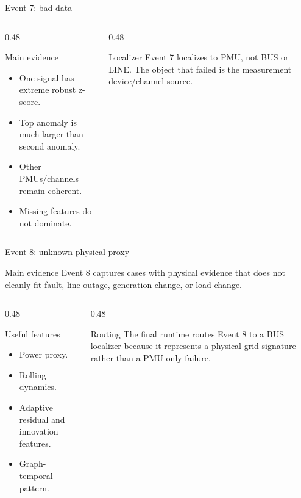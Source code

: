\documentclass[aspectratio=169,10pt,t]{beamer}
\begin{document}
\begin{frame}{Event 7: bad data}
\small
\begin{columns}[T,totalwidth=\textwidth]
\begin{column}{0.48\textwidth}
\begin{block}{Main evidence}
\begin{itemize}
  \item One signal has extreme robust z-score.
  \item Top anomaly is much larger than second anomaly.
  \item Other PMUs/channels remain coherent.
  \item Missing features do not dominate.
\end{itemize}
\end{block}
\end{column}
\begin{column}{0.48\textwidth}
\begin{alertblock}{Localizer}
Event 7 localizes to PMU, not BUS or LINE. The object that failed is the measurement device/channel source.
\end{alertblock}
\end{column}
\end{columns}
\end{frame}

\begin{frame}{Event 8: unknown physical proxy}
\small
\begin{block}{Main evidence}
Event 8 captures cases with physical evidence that does not cleanly fit fault, line outage, generation change, or load change.
\end{block}
\begin{columns}[T,totalwidth=\textwidth]
\begin{column}{0.48\textwidth}
\begin{exampleblock}{Useful features}
\begin{itemize}
  \item Power proxy.
  \item Rolling dynamics.
  \item Adaptive residual and innovation features.
  \item Graph-temporal pattern.
\end{itemize}
\end{exampleblock}
\end{column}
\begin{column}{0.48\textwidth}
\begin{alertblock}{Routing}
The final runtime routes Event 8 to a BUS localizer because it represents a physical-grid signature rather than a PMU-only failure.
\end{alertblock}
\end{column}
\end{columns}
\end{frame}
\end{document}

